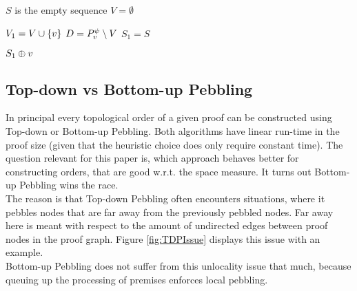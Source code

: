 \documentclass{llncs}
\begin{document}

\begin{algorithm}[h]
  \BlankLine

	$S$ is the empty sequence\;
	$V = \emptyset$\;
	\Return {}\;

  \caption[.]{}
  \label{algo:BUpebbling}
\end{algorithm}

\begin{algorithm}[h]
	
	$V_1 = V \cup \{v\}$\;
	$D = P_{v}^{\psi} \setminus V$\;
	$S_1 = S$
	
	
	\Return $S_1 \oplus v$\;
	
  \caption[.]{}
  \label{algo:visit}
\end{algorithm}

\subsection{Top-down vs Bottom-up Pebbling} %

\label{sec:TDvsBU}

In principal every topological order of a given proof can be constructed using Top-down or Bottom-up Pebbling.
Both algorithms have linear run-time in the proof size (given that the heuristic choice does only require constant time). 
The question relevant for this paper is, which approach behaves better for constructing orders, that are good w.r.t. the space measure.
It turns out Bottom-up Pebbling wins the race.\\
The reason is that Top-down Pebbling often encounters situations, where it pebbles nodes that are far away from the previously pebbled nodes.
Far away here is meant with respect to the amount of undirected edges between proof nodes in the proof graph. Figure \ref{fig:TDPIssue} displays this issue with an example.\\
Bottom-up Pebbling does not suffer from this unlocality issue that much, because queuing up the processing of premises enforces local pebbling.
\end{document}
